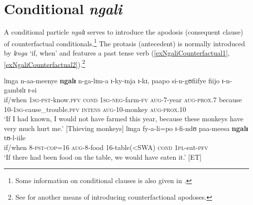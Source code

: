\section{Conditional \textit{ngali}}
\label{ngali}
A conditional particle \textit{ngalɪ} serves to introduce the apodosis (consequent clause) of counterfactual conditionals.\footnote{Some information on conditional clauses is also given in \citet{LusekeloA2016}.} The protasis (antecedent) is normally introduced by \textit{lɪnga} \lq if, when' and features a past tense verb (\ref{exNgaliCounterfactual1}, \ref{exNgaliCounterfactual2}).\footnote{See  for another means of introducing counterfactional apodoses.}

\begin{exe}
\ex\label{exNgaliCounterfactual1} \gll lɪnga n-aa-meenye \textbf{ngalɪ} n-ga-lɪm-a ɪ-ky-ɪnja ɪ-kɪ, paapo si-n-gʊfiifye fiijo ɪ-n-gambɪlɪ ɪ-si\\
if/when \textsc{1sg}-\textsc{pst}-know.\textsc{pfv} \textsc{cond} \textsc{1sg}-\textsc{neg}-farm-\textsc{fv} \textsc{aug}-7-year \textsc{aug}-\textsc{prox.7} because 10-\textsc{1sg}-cause\_trouble.\textsc{pfv} \textsc{intens} \textsc{aug}-10-monkey \textsc{aug}-\textsc{prox.10}\\
\glt `If I had known, I would not have farmed this year, because these monkeys have very much hurt me.' [Thieving monkeys]
\ex \label{exNgaliCounterfactual2}
\gll lɪnga fy-a-li=po ɪ-fi-ndʊ paa-meesa \textbf{ngalɪ} tʊ-l-iile\\
if/when 8-\textsc{pst}-\textsc{cop}=16 \textsc{aug}-8-food 16-table(<SWA) \textsc{cond} \textsc{1pl}-eat-\textsc{pfv}\\
\glt \lq If there had been food on the table, we would have eaten it.' [ET]
\end{exe}

